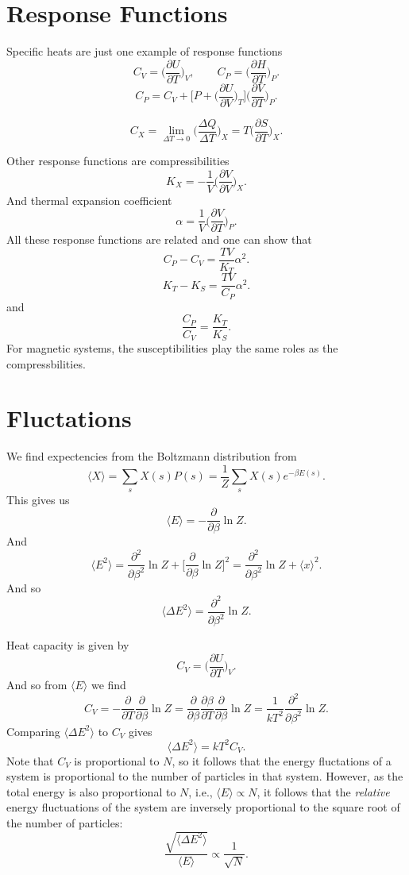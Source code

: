 \documentclass[a4paper, 11pt, notitlepage, english]{article}
\newcommand{\p}{\partial}
\begin{document}
\clearpage

\section*{Response Functions}

Specific heats are just one example of response functions
$$C_V = \bigg(\frac{\p U}{\p T}\bigg)_V, \qquad C_P = \bigg(\frac{\p H}{\p T}\bigg)_P.$$
$$C_P = C_V + \bigg[P + \bigg(\frac{\p U}{\p V}\bigg)_T\bigg]\bigg(\frac{\p V}{\p T}\bigg)_P.$$

$$C_X = \lim_{\Delta T \to 0} \bigg(\frac{\Delta Q}{\Delta T}\bigg)_X = T\bigg(\frac{\p S}{\p T}\bigg)_X.$$

Other response functions are compressibilities
$$K_X = -\frac{1}{V}\bigg(\frac{\p V}{\p V}\bigg)_X.$$
And thermal expansion coefficient
$$\alpha = \frac{1}{V}\bigg(\frac{\p V}{\p T}\bigg)_P.$$
All these response functions are related and one can show that
$$C_P - C_V = \frac{TV}{K_T}\alpha^2.$$
$$K_T - K_S = \frac{TV}{C_P}\alpha^2.$$
and
$$\frac{C_P}{C_V} = \frac{K_T}{K_S}.$$
For magnetic systems, the susceptibilities play the same roles as the compressbilities.

\clearpage

\section*{Fluctations}
We find expectencies from the Boltzmann distribution from
$$\langle X \rangle = \sum_s X(s) P(s) = \frac{1}{Z} \sum_s X(s) e^{-\beta E(s)}.$$
This gives us
$$\langle E \rangle = - \frac{\p }{\p \beta} \ln Z.$$
And 
$$\langle E^2 \rangle = \frac{\p^2}{\p \beta^2} \ln Z + \bigg[\frac{\p }{\p \beta}\ln Z \bigg]^2 = \frac{\p^2}{\p \beta^2} \ln Z  + \langle x \rangle^2.$$
And so
$$\langle \Delta E^2 \rangle = \frac{\p^2}{\p \beta^2} \ln Z.$$

Heat capacity is given by
$$C_V = \bigg(\frac{\p U}{\p T}\bigg)_V.$$
And so from $\langle E \rangle$ we find
$$C_V = -\frac{\p }{\p T} \frac{\p}{\p \beta} \ln Z = \frac{\p}{\p \beta} \frac{\p \beta}{\p T} \frac{\p}{\p \beta} \ln Z = \frac{1}{kT^2} \frac{\p^2}{\p \beta^2} \ln Z.$$
Comparing $\langle \Delta E^2 \rangle$ to $C_V$ gives
$$\langle \Delta E^2 \rangle = kT^2 C_V.$$
Note that $C_V$ is proportional to $N$, so it follows that the energy fluctations of a system is proportional to the number of particles in that system. However, as the total energy is also proportional to $N$, i.e., $\langle E \rangle \propto N$, it follows that the \emph{relative} energy fluctuations of the system are inversely proportional to the square root of the number of particles:
$$\frac{\sqrt{\langle \Delta E^2 \rangle}}{\langle E \rangle} \propto \frac{1}{\sqrt{N}}.$$
\end{document}
